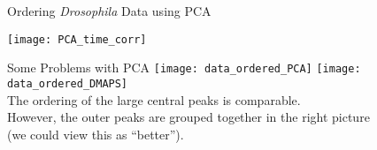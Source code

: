 %
%
%
%

\begin{frame}{Ordering {\em Drosophila} Data using PCA}
  \centering
  
	\centering
	\texttt{[image: PCA\_time\_corr]}	
\end{frame}


\begin{frame}{Some Problems with PCA}
    \centering
    \texttt{[image: data\_ordered\_PCA]}
    \texttt{[image: data\_ordered\_DMAPS]}\\
    The ordering of the large central peaks is comparable.\\
    However, the outer peaks are grouped together in the right picture \\ (we could view this as ``better'').

\end{frame}

